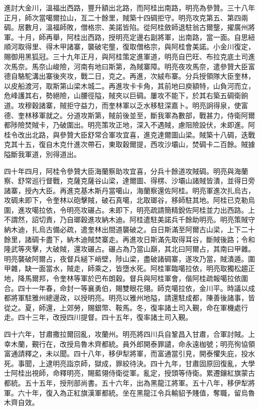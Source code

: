 \begin{pinyinscope}
進討大金川，溫福出西路，豐升額出北路，而阿桂出南路，明亮為參贊。三十八年正月，師次當噶爾拉山，亙二十餘里，賊築十四碉拒守。明亮攻克第五、第四兩碉。居數月，溫福師敗，僧格宗、美諾皆陷。從阿桂斂師退駐翁古爾壟，擢廣州將軍。十月，師再舉，阿桂出西路，授明亮定邊右副將軍，出南路，當一面。自思紐順河取得里、得木甲諸寨，襲破宅壟，復取僧格宗，與阿桂會美諾。小金川復定，賜御用黑狐冠。三十九年正月，與阿桂策定進軍道，明亮自巴旺、布拉克底土司進次馬奈。馬奈山峻險，河南有地曰斯第，為賊寨障。明亮夜攻馬奈，遣參贊大臣富德自駱駝溝出寨後夾攻，戰二日，克之。再進，次絨布寨。分兵授領隊大臣奎林，以皮船渡河，取斯第山梁木城二。再進攻卡卡角，其前地曰庾額特，山負河而立，危峰護其右，勢絕險，山腰徑隘，賊夾以巨碉。屢攻不能下，於其右築五碉衛餉道。攻穆穀諸寨，賊拒守益力，而奎林軍以乏水移駐深嘉卜。明亮詗得泉，使富德、奎林移軍就之。分道攻斯第，賊前後並至，斷我軍為數部，戰甚力，侍衛阿爾都陟險焚賊卡，乃破圍出。明亮策攻正地，深入不遇賊，慮阻險設伏，未即進。阿桂令改出北路，與參贊大臣舒常合軍攻宜喜，進克達爾圖山梁。賊築十八碉，迭戰克其十五，復自木克什進次帶石，東取穀爾提，西攻沙壩山，焚碉卡二百餘。賊據隘斷我軍道，別得道出。

四十年四月，阿桂令參贊大臣海蘭察助攻宜喜，分兵十餘道攻賊碉。明亮與海蘭察、舒常巡行督戰，克薩克薩谷山梁，達爾圖、得楞、沙壩山諸賊皆潰，並得日旁諸寨，授內大臣。再進克基木斯丹當噶山，海蘭察還佐阿桂。明亮軍進次扎烏古，攻碉未即下，令奎林以砲擊賊，破石真噶，北取瑯谷，移師駐其地。阿桂已克勒烏圍，進攻噶拉依，令明亮攻碾占。未即下，明亮疏請簡精銳佐阿桂並力出西路。上不謂然，詔切責，乃自瑯穀進攻納木迪。阿桂遣駐美諾兵千餘助明亮。明亮策賊守納木迪，扎烏古備必疏，遣奎林出間道襲破之。自日斯滿至阿爾古山梁，上下二十餘里，諸碉卡盡下，納木迪賊焚寨走。再進攻日斯滿先取得耳谷，斷賊後路；令和隆武等夾擊，大破賊，還攻碾占。碾占為乃當山巔，其北曰阿爾占，其南曰甲雜。明亮襲破阿爾占，夜督兵縋下峭壁，陟山梁，盡破諸碉寨，遂攻乃當，賊潰遁。圍甲雜，缺一面當水，賊走，師乘之，皆墮水死。阿桂軍臨噶拉依，明亮取獨松趨正地，降馬爾邦，令奎林等軍於巴布朗穀。督兵與阿桂軍會，偕阿桂疏報噶拉依圍合。四十一年春，命封一等襄勇伯，賜雙眼花翎。師克噶拉依，金川平。時議以成都將軍駐雅州總邊政，以授明亮。明亮以雅州地隘，請還駐成都，陳善後諸事，皆從之。夏，師還，上郊勞，賜銀幣、鞍馬。冬，復率諸土司入覲，命在軍機處行走。四十三年，改授四川提督。四十五年，復率諸土司入覲。

四十六年，甘肅撒拉爾回亂，攻蘭州。明亮將四川兵自鞏昌入甘肅，合軍討賊。上幸木蘭，覲行在，改授烏魯木齊都統。員外郎開泰罪譴，命永遠枷號；明亮徇協領富通請釋之，未以聞。四十八年，移伊犁將軍，而富通當引見，開泰懼失庇，投水死。事聞，上逮明亮詣京師，獄成，罪絞待決。四十九年，甘肅固原回復亂，大學士阿桂出視師，命釋明亮，賜藍翎侍衛從軍。亂定，授頭等侍衛。累遷鑲紅旗蒙古都統。五十五年，授刑部尚書。五十六年，出為黑龍江將軍。五十八年，移伊犁將軍。六十年，復入為正紅旗漢軍都統。坐在黑龍江令兵輸貂予賤值，奪職，留烏魯木齊自效。


\end{pinyinscope}
